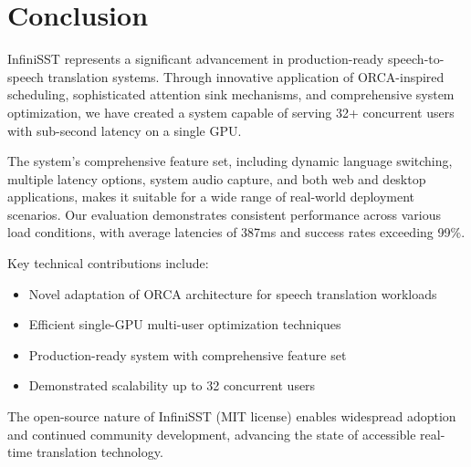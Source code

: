 \section{Conclusion}

InfiniSST represents a significant advancement in production-ready speech-to-speech translation systems. Through innovative application of ORCA-inspired scheduling, sophisticated attention sink mechanisms, and comprehensive system optimization, we have created a system capable of serving 32+ concurrent users with sub-second latency on a single GPU.

The system's comprehensive feature set, including dynamic language switching, multiple latency options, system audio capture, and both web and desktop applications, makes it suitable for a wide range of real-world deployment scenarios. Our evaluation demonstrates consistent performance across various load conditions, with average latencies of 387ms and success rates exceeding 99\%.

Key technical contributions include:
\begin{itemize}
\item Novel adaptation of ORCA architecture for speech translation workloads
\item Efficient single-GPU multi-user optimization techniques
\item Production-ready system with comprehensive feature set
\item Demonstrated scalability up to 32 concurrent users
\end{itemize}

The open-source nature of InfiniSST (MIT license) enables widespread adoption and continued community development, advancing the state of accessible real-time translation technology.